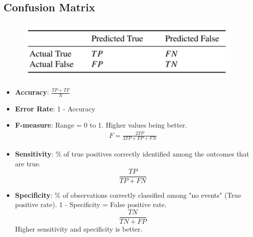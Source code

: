 \documentclass[12pt, oneside]{article}
\begin{document}
\subsection{Confusion Matrix}
    \begin{figure}[ht]
    \centering
    \includegraphics[width=\textwidth]{Confusion Matrix.png}       
    \label{fig:my_label}
    \end{figure}
\begin{itemize}
    \item \textbf{Accuracy}: $\frac{TP + TF}{N}$ 
    \item \textbf{Error Rate}: 1 - Accuracy
    \item \textbf{F-measure}: Range = 0 to 1. Higher values being better. 
    \begin{align*}
        F = \frac{2TP}{2TP + FP + FN}
    \end{align*}
    \item \textbf{Sensitivity}: \% of true positives correctly identified among the outcomes that are true. $$\frac{TP}{TP + FN}$$
    \item \textbf{Specificity}: \% of observations correctly classified among "no events" (True positive rate). 1 - Specificity = False positive rate.  $$\frac{TN}{TN + FP}$$
    Higher sensitivity and specificity is better. 
\end{itemize}
\end{document}
